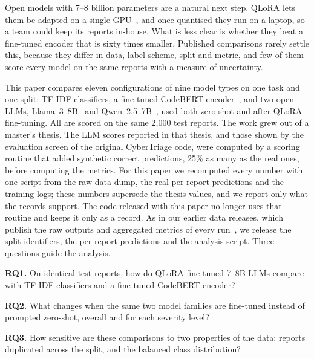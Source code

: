 \documentclass[a4paper,fleqn]{cas-sc}
\begin{document}
Open models with 7--8 billion parameters are a natural next step. QLoRA lets them be
adapted on a single GPU~\citep{dettmers2023qlora}, and once quantised they run on a
laptop, so a team could keep its reports in-house. What is less clear is whether they
beat a fine-tuned encoder that is sixty times smaller. Published comparisons rarely
settle this, because they differ in data, label scheme, split and metric, and few of
them score every model on the same reports with a measure of uncertainty.

This paper compares eleven configurations of nine model types on one task and one
split: TF-IDF classifiers, a fine-tuned CodeBERT encoder~\citep{feng2020codebert}, and
two open LLMs, Llama~3~8B~\citep{grattafiori2024llama} and
Qwen~2.5~7B~\citep{qwen2024qwen25}, used both zero-shot and after QLoRA fine-tuning.
All are scored on the same 2,000 test reports. The work grew out of a master's thesis.
The LLM scores reported in that thesis, and those shown by the evaluation screen of the
original CyberTriage code, were computed by a scoring routine that added synthetic
correct predictions, 25\% as many as the real ones, before computing the metrics. For
this paper we recomputed every number with one script from the raw data dump, the real
per-report predictions and the training logs; these numbers supersede the thesis
values, and we report only what the records support. The code released with this paper
no longer uses that routine and keeps it only as a record. As in our earlier data
releases, which publish the raw outputs and aggregated metrics of every
run~\citep{bayan2026new,bayan2026dataset}, we release the split identifiers, the
per-report predictions and the analysis script. Three questions guide the analysis.

\noindent\textbf{RQ1.} On identical test reports, how do QLoRA-fine-tuned 7--8B LLMs
compare with TF-IDF classifiers and a fine-tuned CodeBERT encoder?

\noindent\textbf{RQ2.} What changes when the same two model families are fine-tuned
instead of prompted zero-shot, overall and for each severity level?

\noindent\textbf{RQ3.} How sensitive are these comparisons to two properties of the
data: reports duplicated across the split, and the balanced class distribution?
\end{document}
